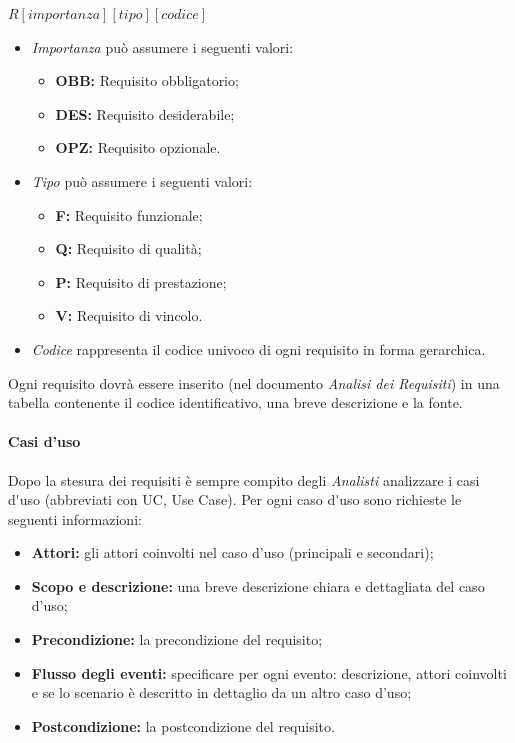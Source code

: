 \begin{center}
	\begin{math}
		R \left [ importanza \right ] \left [ tipo\right ]\left [codice\right ]
	\end{math}
\end{center}
\begin{itemize}
	\item \textit{Importanza} può assumere i seguenti valori:
	\begin{itemize}
		\item \textbf{OBB:} Requisito obbligatorio;
		\item \textbf{DES:} Requisito desiderabile;
		\item \textbf{OPZ:} Requisito opzionale.
	\end{itemize}
	\item \textit{Tipo} può assumere i seguenti valori:
	\begin{itemize}
		\item \textbf{F:} Requisito funzionale;
		\item \textbf{Q:} Requisito di qualità;
		\item \textbf{P:} Requisito di prestazione;
		\item \textbf{V:} Requisito di vincolo.
	\end{itemize}
	\item \textit{Codice} rappresenta il codice univoco di ogni requisito in forma gerarchica.
\end{itemize}
Ogni requisito dovrà essere inserito (nel documento \textit{Analisi dei Requisiti}) in una tabella contenente il codice identificativo, una breve descrizione e la fonte.

\paragraph{Casi d'uso}
Dopo la stesura dei requisiti è sempre compito degli \textit{Analisti} analizzare i \gls{casi d'uso} (abbreviati con UC, Use Case).
Per ogni \gls{caso d'uso} sono richieste le seguenti informazioni:
\begin{itemize}
	\item \textbf{Attori:} gli attori coinvolti nel caso d'uso (principali e secondari);
	\item \textbf{Scopo e descrizione:} una breve descrizione chiara e dettagliata del caso d'uso;
	\item \textbf{Precondizione:} la precondizione del requisito;
	\item \textbf{Flusso degli eventi:} specificare per ogni evento: descrizione, attori coinvolti e se lo scenario è descritto in dettaglio da un altro caso d'uso;
	\item \textbf{Postcondizione:} la postcondizione del requisito.
\end{itemize}

